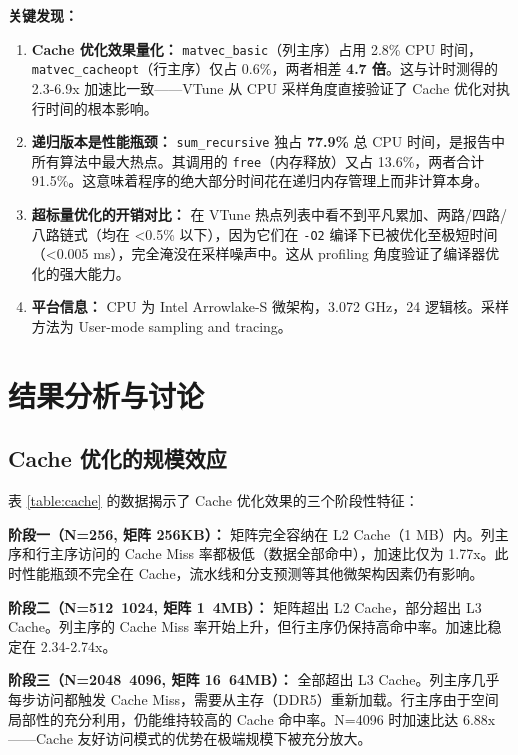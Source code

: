 \documentclass[a4paper]{article}
\begin{document}
\textbf{关键发现：}

\begin{enumerate}
    \item \textbf{Cache 优化效果量化：} \texttt{matvec\_basic}（列主序）占用 2.8\% CPU 时间，\texttt{matvec\_cacheopt}（行主序）仅占 0.6\%，两者相差 \textbf{4.7 倍}。这与计时测得的 2.3-6.9x 加速比一致——VTune 从 CPU 采样角度直接验证了 Cache 优化对执行时间的根本影响。
    \item \textbf{递归版本是性能瓶颈：} \texttt{sum\_recursive} 独占 \textbf{77.9\%} 总 CPU 时间，是报告中所有算法中最大热点。其调用的 \texttt{free}（内存释放）又占 13.6\%，两者合计 91.5\%。这意味着程序的绝大部分时间花在递归内存管理上而非计算本身。
    \item \textbf{超标量优化的开销对比：} 在 VTune 热点列表中看不到平凡累加、两路/四路/八路链式（均在 <0.5\% 以下），因为它们在 \texttt{-O2} 编译下已被优化至极短时间（<0.005 ms），完全淹没在采样噪声中。这从 profiling 角度验证了编译器优化的强大能力。
    \item \textbf{平台信息：} CPU 为 Intel Arrowlake-S 微架构，3.072 GHz，24 逻辑核。采样方法为 User-mode sampling and tracing。
\end{enumerate}

\section{结果分析与讨论}

\subsection{Cache 优化的规模效应}

表 \ref{table:cache} 的数据揭示了 Cache 优化效果的三个阶段性特征：

\textbf{阶段一（N=256, 矩阵 256KB）：} 矩阵完全容纳在 L2 Cache（1 MB）内。列主序和行主序访问的 Cache Miss 率都极低（数据全部命中），加速比仅为 1.77x。此时性能瓶颈不完全在 Cache，流水线和分支预测等其他微架构因素仍有影响。

\textbf{阶段二（N=512~1024, 矩阵 1~4MB）：} 矩阵超出 L2 Cache，部分超出 L3 Cache。列主序的 Cache Miss 率开始上升，但行主序仍保持高命中率。加速比稳定在 2.34-2.74x。

\textbf{阶段三（N=2048~4096, 矩阵 16~64MB）：} 全部超出 L3 Cache。列主序几乎每步访问都触发 Cache Miss，需要从主存（DDR5）重新加载。行主序由于空间局部性的充分利用，仍能维持较高的 Cache 命中率。N=4096 时加速比达 6.88x——Cache 友好访问模式的优势在极端规模下被充分放大。
\end{document}
